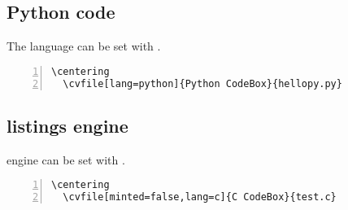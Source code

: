 \documentclass{ctxdoc-en}
\begin{document}
\subsection{Python code}
The language can be set with .

\begin{Verbatim}[frame=none,numbers=left,gobble=2]
  \centering
  \cvfile[lang=python]{Python CodeBox}{hellopy.py}
\end{Verbatim}

\begin{center}
  \begin{minipage}{0.85\textwidth}
  \end{minipage}
\end{center}

\newpage

\subsection{listings engine}
 engine can be set with .

\begin{Verbatim}[frame=none,numbers=left,gobble=2]
  \centering
  \cvfile[minted=false,lang=c]{C CodeBox}{test.c}
\end{Verbatim}

\begin{center}
  \begin{minipage}{0.85\textwidth}
  \end{minipage}
\end{center}
\end{document}
